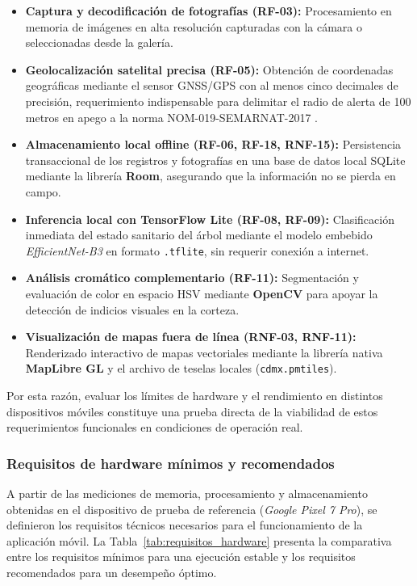 \begin{itemize}
    \item \textbf{Captura y decodificación de fotografías (\textbf{RF-03}):} Procesamiento en memoria de imágenes en alta resolución capturadas con la cámara o seleccionadas desde la galería.
    \item \textbf{Geolocalización satelital precisa (\textbf{RF-05}):} Obtención de coordenadas geográficas mediante el sensor GNSS/GPS con al menos cinco decimales de precisión, requerimiento indispensable para delimitar el radio de alerta de 100 metros en apego a la norma NOM-019-SEMARNAT-2017 \cite{nom019_semarnat_2017}.
    \item \textbf{Almacenamiento local offline (\textbf{RF-06}, \textbf{RF-18}, \textbf{RNF-15}):} Persistencia transaccional de los registros y fotografías en una base de datos local SQLite mediante la librería \textbf{Room}, asegurando que la información no se pierda en campo.
    \item \textbf{Inferencia local con TensorFlow Lite (\textbf{RF-08}, \textbf{RF-09}):} Clasificación inmediata del estado sanitario del árbol mediante el modelo embebido \textit{EfficientNet-B3} en formato \texttt{.tflite}, sin requerir conexión a internet.
    \item \textbf{Análisis cromático complementario (\textbf{RF-11}):} Segmentación y evaluación de color en espacio HSV mediante \textbf{OpenCV} para apoyar la detección de indicios visuales en la corteza.
    \item \textbf{Visualización de mapas fuera de línea (\textbf{RNF-03}, \textbf{RNF-11}):} Renderizado interactivo de mapas vectoriales mediante la librería nativa \textbf{MapLibre GL} y el archivo de teselas locales (\texttt{cdmx.pmtiles}).
\end{itemize}

Por esta razón, evaluar los límites de hardware y el rendimiento en distintos dispositivos móviles constituye una prueba directa de la viabilidad de estos requerimientos funcionales en condiciones de operación real.

\subsubsection{Requisitos de hardware mínimos y recomendados}
\label{subsubsec:requisitos-hardware}

A partir de las mediciones de memoria, procesamiento y almacenamiento obtenidas en el dispositivo de prueba de referencia (\textit{Google Pixel 7 Pro}), se definieron los requisitos técnicos necesarios para el funcionamiento de la aplicación móvil. La Tabla~\ref{tab:requisitos_hardware} presenta la comparativa entre los requisitos mínimos para una ejecución estable y los requisitos recomendados para un desempeño óptimo.

